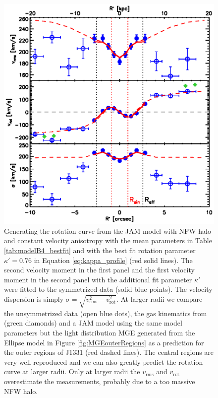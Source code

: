 \begin{figure}
\centering
\includegraphics[width=0.7\linewidth]{fig/B4_rms_rot_curves_best_model.ps}
\caption{Generating the rotation curve from the JAM model with NFW halo and constant velocity anisotropy with the mean parameters in Table \ref{tab:modelB4_bestfit} and with the best fit rotation parameter $\kappa' = 0.76$ in Equation \ref{eq:kappa_profile} (red solid lines). The second velocity moment in the first panel and the first velocity moment in the second panel with the additional fit parameter $\kappa'$ were fitted to the symmetrized data (solid blue points). The velocity dispersion is simply $\sigma = \sqrt{v_\text{rms}^2 - v_\text{rot}^2}$. At larger radii we compare the unsymmetrized data (open blue dots), the gas kinematics from \citet{SWELLSV} (green diamonds) and a JAM model using the same model parameters but the light distribution MGE generated from the Ellipse model in Figure \ref{fig:MGEouterRegions} as a prediction for the outer regions of J1331 (red dashed lines). The central regions are very well reproduced and we can also greatly predict the rotation curve at larger radii. Only at larger radii the $v_\text{rms}$ and $v_\text{rot}$ overestimate the measurements, probably due to a too massive NFW halo. }
\label{fig:modelB4_vrot}
\end{figure}
